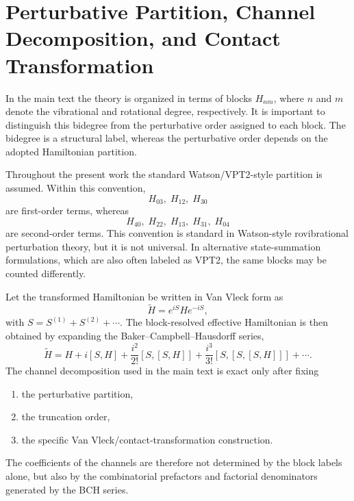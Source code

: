 \appendix

\section{Perturbative Partition, Channel Decomposition, and Contact Transformation}

In the main text the theory is organized in terms of blocks $H_{nm}$, where
$n$ and $m$ denote the vibrational and rotational degree, respectively. It is
important to distinguish this bidegree from the perturbative order assigned to
each block. The bidegree is a structural label, whereas the perturbative order
depends on the adopted Hamiltonian partition.

Throughout the present work the standard Watson/VPT2-style partition is
assumed. Within this convention,
\begin{equation}
H_{03},\;H_{12},\;H_{30}
\end{equation}
are first-order terms, whereas
\begin{equation}
H_{40},\;H_{22},\;H_{13},\;H_{31},\;H_{04}
\end{equation}
are second-order terms. This convention is standard in Watson-style
rovibrational perturbation theory, but it is not universal. In alternative
state-summation formulations, which are also often labeled as VPT2, the same
blocks may be counted differently.

Let the transformed Hamiltonian be written in Van Vleck form as
\begin{equation}
\widetilde H = e^{iS} H e^{-iS},
\end{equation}
with $S=S^{(1)}+S^{(2)}+\cdots$. The block-resolved effective Hamiltonian is
then obtained by expanding the Baker--Campbell--Hausdorff series,
\begin{equation}
\widetilde H
=
H + i[S,H] + \frac{i^2}{2!}[S,[S,H]] + \frac{i^3}{3!}[S,[S,[S,H]]] + \cdots .
\end{equation}
The channel decomposition used in the main text is exact only after fixing
\begin{enumerate}
\item the perturbative partition,
\item the truncation order,
\item the specific Van Vleck/contact-transformation construction.
\end{enumerate}
The coefficients of the channels are therefore not determined by the block
labels alone, but also by the combinatorial prefactors and factorial
denominators generated by the BCH series.

